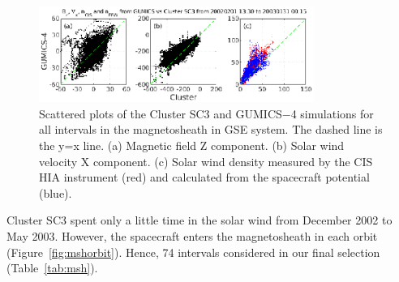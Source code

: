 \documentclass[b5paper,10pt]{article}
\begin{document}

\begin{figure}[t]
\centering
\includegraphics[width=0.8\textwidth,angle=0]{mufcikk-f09}
\caption{Scattered plots of the Cluster SC3 and GUMICS$-$4 simulations for all intervals in the magnetosheath in GSE system. The dashed line is the y=x line. (a) Magnetic field Z component. (b) Solar wind velocity X component. (c) Solar wind density measured by the CIS HIA instrument (red) and calculated from the spacecraft potential (blue).}
\label{fig:mshscatplot}
\end{figure}

Cluster SC3 spent only a little time in the solar wind from December 2002 to May 2003. However, the spacecraft enters the magnetosheath in each orbit (Figure~\ref{fig:mshorbit}). %
Hence, 74 intervals considered in our final selection (Table~\ref{tab:msh}). 
\end{document}
